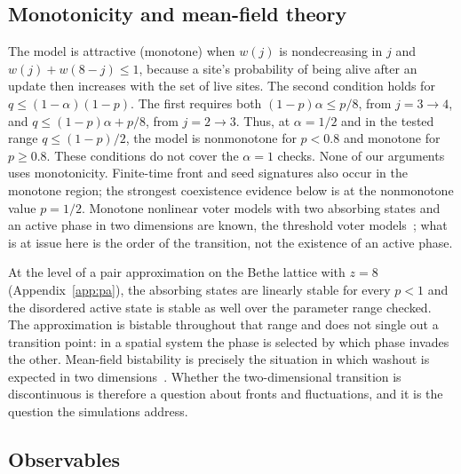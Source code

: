 \documentclass[pre,twocolumn,superscriptaddress,showpacs,floatfix]{revtex4-2}
\begin{document}
\subsection{Monotonicity and mean-field theory}
\label{sec:mf}

The model is attractive (monotone) when $w(j)$ is nondecreasing in $j$ and $w(j)+w(8-j)\le 1$,
because a site's probability of being alive after an update then increases with the set of live
sites. The second condition holds for $q\le(1-\alpha)(1-p)$.
The first requires both $(1-p)\alpha\le p/8$, from $j=3\to4$,
and $q\le(1-p)\alpha+p/8$, from $j=2\to3$.
Thus, at $\alpha=1/2$ and in the tested range
$q\le(1-p)/2$, the model is nonmonotone for $p<0.8$ and monotone
for $p\ge0.8$. These conditions do not cover the $\alpha=1$ checks.
None of our arguments uses monotonicity. Finite-time front and seed signatures
also occur in the monotone region; the strongest coexistence evidence below
is at the nonmonotone value $p=1/2$.
Monotone nonlinear voter models with two absorbing states and an
active phase in two dimensions are known, the threshold voter
models~\cite{liggett1994}; what is at issue here is the order of the transition, not the
existence of an active phase.

At the level of a pair approximation on the Bethe lattice with $z = 8$ (Appendix~\ref{app:pa}),
the absorbing states are linearly stable for every $p<1$ and the disordered active state is
stable as well over the parameter range checked. The approximation is bistable
throughout that range and does not single
out a transition point: in a spatial system the phase is selected by which phase invades the
other. Mean-field bistability is precisely the situation in which washout is expected in two
dimensions~\cite{castellano2009}. Whether the two-dimensional transition is discontinuous is
therefore a question about fronts and fluctuations, and it is the question the simulations
address.

\subsection{Observables}
\end{document}
